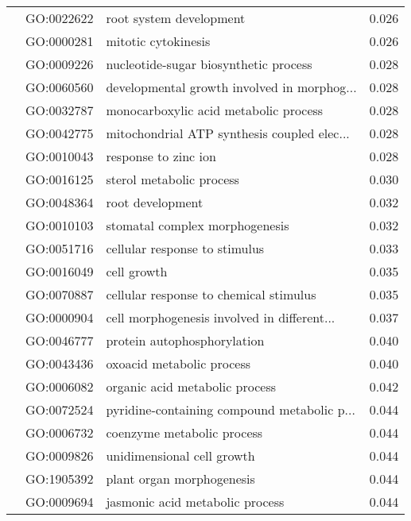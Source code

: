 \begin{longtable}{lllr}
   & GO:0022622 &                      root system development &         0.026 \\
   & GO:0000281 &                          mitotic cytokinesis &         0.026 \\
   & GO:0009226 &        nucleotide-sugar biosynthetic process &         0.028 \\
   & GO:0060560 &  developmental growth involved in morphog... &         0.028 \\
   & GO:0032787 &        monocarboxylic acid metabolic process &         0.028 \\
   & GO:0042775 &  mitochondrial ATP synthesis coupled elec... &         0.028 \\
   & GO:0010043 &                         response to zinc ion &         0.028 \\
   & GO:0016125 &                     sterol metabolic process &         0.030 \\
   & GO:0048364 &                             root development &         0.032 \\
   & GO:0010103 &               stomatal complex morphogenesis &         0.032 \\
   & GO:0051716 &                cellular response to stimulus &         0.033 \\
   & GO:0016049 &                                  cell growth &         0.035 \\
   & GO:0070887 &       cellular response to chemical stimulus &         0.035 \\
   & GO:0000904 &  cell morphogenesis involved in different... &         0.037 \\
   & GO:0046777 &                  protein autophosphorylation &         0.040 \\
   & GO:0043436 &                    oxoacid metabolic process &         0.040 \\
   & GO:0006082 &               organic acid metabolic process &         0.042 \\
   & GO:0072524 &  pyridine-containing compound metabolic p... &         0.044 \\
   & GO:0006732 &                   coenzyme metabolic process &         0.044 \\
   & GO:0009826 &                   unidimensional cell growth &         0.044 \\
   & GO:1905392 &                    plant organ morphogenesis &         0.044 \\
   & GO:0009694 &              jasmonic acid metabolic process &         0.044 \\

\end{longtable}
